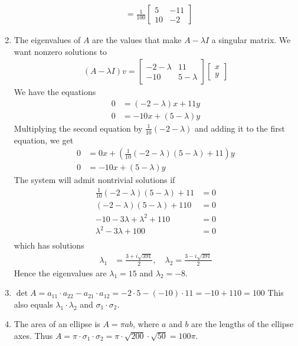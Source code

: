 \documentclass[12pt]{article}
\newenvironment{sol}[1][Solution]{\begin{trivlist}
		\item[\hskip \labelsep {\bfseries #1:}]}{\end{trivlist}}
\begin{document}
\begin{sol}
\begin{enumerate}[label=(\alph*)]
\begin{align*}
			&=\frac{1}{100}\begin{bmatrix}
				5 & -11\\
				10 & -2
			\end{bmatrix}
		\end{align*}
		\item The eigenvalues of $A$ are the values that make $A-\lambda I$ a singular matrix. We want
		nonzero solutions to
		\begin{align*}
			(A-\lambda I)v=\begin{bmatrix}
				-2-\lambda& 11\\
				-10 & 5-\lambda
			\end{bmatrix}
			\begin{bmatrix}
				x\\
				y
			\end{bmatrix}
		\end{align*}
		We have the equations
		\begin{align*}
			0&=(-2-\lambda)x+11y\\
			0&=-10x+(5-\lambda)y
		\end{align*}
		Multiplying the second equation by $\frac{1}{10}(-2-\lambda)$ and adding it to the first equation,
		we get
		\begin{align*}
			0&=0x + \left(\frac{1}{10}(-2-\lambda)(5-\lambda)+11\right)y\\
			0&=-10x + (5-\lambda)y
		\end{align*}
		The system will admit nontrivial solutions if
		\begin{align*}
			\frac{1}{10}(-2-\lambda)(5-\lambda)+11&=0\\
			(-2-\lambda)(5-\lambda)+110&=0\\
			-10-3\lambda+\lambda^2+110&=0\\
			\lambda^2-3\lambda +100&=0\\
		\end{align*}
		which has solutions
		\begin{align*}
			\lambda_1&=\frac{3+i\sqrt{391}}{2},\quad \lambda_2=\frac{3-i\sqrt{391}}{2}
		\end{align*}
		Hence the eigenvalues are $\lambda_1=15$ and $\lambda_2=-8$.
		\item $\det A=a_{11}\cdot a_{22}-a_{21}\cdot a_{12}=-2\cdot 5 - (-10)\cdot 11=-10+110 = 100$
		This also equals $\lambda_1\cdot \lambda_2$ and $\sigma_1\cdot \sigma_2$.
		\item The area of an ellipse is $A=\pi ab$, where $a$ and $b$ are the lengths of the ellipse axes.
		Thus $A=\pi \cdot\sigma_1\cdot \sigma_2=\pi \cdot \sqrt{200}\cdot \sqrt{50}=100\pi$.
	\end{enumerate}
\end{sol}
\end{document}
